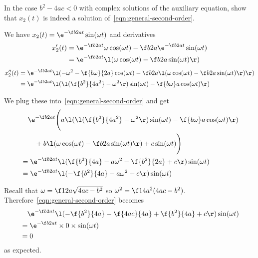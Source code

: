 \documentclass[a4paper]{article}
\begin{document}
\newpage
\subsection{~} %

\begin{questionbody}
In the case $b^2 - 4ac < 0$ with complex solutions of the auxiliary equation, show that $x_2(t)$ is indeed a solution of~\eqref{eqn:general-second-order}.
\end{questionbody}

We have $x_2(t) = \e^{-\f b{2a} t} \sin(\omega t)$ and derivatives \begin{align*}
x_2'(t) &= \e^{-\f b{2a} t} \omega \cos(\omega t) - \f b{2a} \e^{-\f b{2a} t} \sin(\omega t) \\
&= \e^{-\f b{2a} t} \l( \omega \cos(\omega t) - \f b{2a} \sin(\omega t) \r)
\end{align*}
\begin{align*}
x_2''(t) &= \e^{-\f b{2a} t} \l(
-\omega^2 - \f{b\omega}{2a} \cos(\omega t)
-\f b{2a} \l( \omega \cos(\omega t) - \f b{2a} \sin(\omega t) \r)
\r) \\
&= \e^{-\f b{2a} t} \l(
\l( \f{b^2}{4a^2} - \omega^2 \r) \sin(\omega t) - \f{b\omega}a \cos(\omega t)
\r)
\end{align*}

We plug these into~\eqref{eqn:general-second-order} and get \begin{align*}
&\quad \e^{-\f b{2a} t} \Bigg( a \l( \l( \f{b^2}{4a^2} - \omega^2 \r) \sin(\omega t) - \f{b\omega}a \cos(\omega t) \r) \\
& \qquad + b \l( \omega \cos(\omega t) - \f b{2a} \sin(\omega t) \r) + c \sin(\omega t) \Bigg) \\
%
&= \e^{-\f b{2a} t} \l( \f{b^2}{4a} - a\omega^2 - \f{b^2}{2a} + c \r) \sin(\omega t) \\
&= \e^{-\f b{2a} t} \l( -\f{b^2}{4a} - a\omega^2 + c \r) \sin(\omega t)
\end{align*}

Recall that $\omega = \f1{2a} \sqrt{4ac - b^2}$ so $\omega^2 = \f1{4a^2} (4ac - b^2)$. Therefore~\eqref{eqn:general-second-order} becomes \begin{align*}
&\quad \e^{-\f b{2a} t} \l( -\f{b^2}{4a} - \f{4ac}{4a} + \f{b^2}{4a} + c \r) \sin(\omega t) \\
&= \e^{-\f b{2a} t} \times 0 \times \sin(\omega t) \\
&= 0
\end{align*} as expected.
\end{document}
